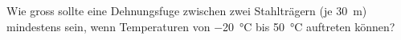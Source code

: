 
\def\LAENGE{30}
\begin{aufgabe}
	Wie gross sollte eine Dehnungsfuge zwischen zwei Stahlträgern (je \SI{\LAENGE}{m}) mindestens sein,
	wenn Temperaturen von \SI{-20}{\celsius} bis \SI{50}{\celsius} auftreten können?


\end{aufgabe}

